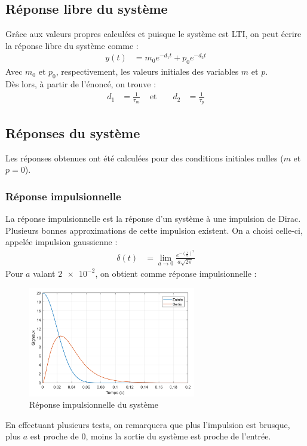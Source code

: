 \documentclass[a4paper, 12pt]{article}
\begin{document}
	\subsection{Réponse libre du système}
	Grâce aux valeurs propres calculées et puisque le système est LTI, on peut écrire la réponse libre du système comme :
	\begin{align}
		y(t) & = {m}_{0}e^{-{d}_{1}t} + {p}_{0}e^{-{d}_{2}t}
	\end{align}
	Avec ${m}_{0}$ et ${p}_{0}$, respectivement, les valeurs initiales des variables $m$ et $p$.\\
	Dès lors, à partir de l'énoncé, on trouve :
	\begin{align}
		{d}_{1} & = \frac{1}{{\tau}_{m}} & \text{ et } && {d}_{2} & = \frac{1}{{\tau}_{p}}
	\end{align}
	\subsection{Réponses du système}
	Les réponses obtenues ont été calculées pour des conditions initiales nulles ($m$ et $p = 0$).
	\subsubsection{Réponse impulsionnelle}
	La réponse impulsionnelle est la réponse d'un système à une impulsion de Dirac.\\
	Plusieurs bonnes approximations de cette impulsion existent. On a choisi celle-ci, appelée impulsion gaussienne :
	\begin{align}
		\delta(t) & = \lim\limits_{a \rightarrow 0} \frac{{e}^{-\left(\frac{x}{a}\right)^{2}}}{a\sqrt{2\pi}}
	\end{align}
	Pour $a$ valant $\num{2e-2}$, on obtient comme réponse impulsionnelle :
	\begin{figure}[H]
		\centering
		\includegraphics[width = 0.65\textwidth]{resources/pdf/rep_imp.pdf}
		\caption{Réponse impulsionnelle du système}
	\end{figure}
	En effectuant plusieurs tests, on remarquera que plus l'impulsion est brusque, \cad plus $a$ est proche de $0$, moins la sortie du système est proche de l'entrée.\\
\end{document}
